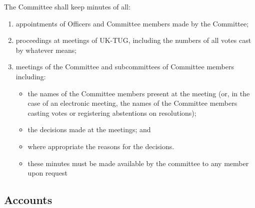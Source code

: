 \documentclass[a4paper,11pt]{article}
\begin{document}
The Committee shall keep minutes of all:
\begin{enumerate}
\item appointments of Officers and Committee members made by the Committee;
\item proceedings at meetings of UK-TUG, including the numbers of all votes cast by 
  whatever means;
\item meetings of the Committee and subcommittees of Committee members
  including:
\begin{itemize}
\item the names of the Committee members present at the meeting (or, in the case of an electronic meeting, the names of the Committee members casting votes or registering abstentions on resolutions);
\item the decisions made at the meetings; and
\item where appropriate the reasons for the decisions.
\item these minutes must be made available by the committee to any member upon
  request
\end{itemize}
\end{enumerate}


\subsection{Accounts}
\end{document}
